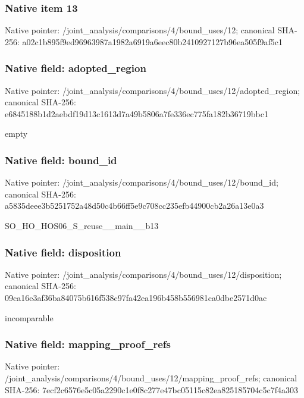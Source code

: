 \documentclass[10pt,a4paper]{article}
\begin{document}
\subsubsection{Native item 13}
Native pointer: /joint\_\allowbreak{}analysis/comparisons/4/bound\_\allowbreak{}uses/12; canonical SHA-256: a02c1b895f9ed96963987a1982a6919a6eec80b2410927127b96ea505f9af5c1

\subsubsection{Native field: adopted\_\allowbreak{}region}
Native pointer: /joint\_\allowbreak{}analysis/comparisons/4/bound\_\allowbreak{}uses/12/adopted\_\allowbreak{}region; canonical SHA-256: e6845188b1d2aebdf19d13c1613d7a49b5806a7fe336ec775fa182b36719bbc1

\begingroup\raggedright\sloppy empty\par\endgroup

\subsubsection{Native field: bound\_\allowbreak{}id}
Native pointer: /joint\_\allowbreak{}analysis/comparisons/4/bound\_\allowbreak{}uses/12/bound\_\allowbreak{}id; canonical SHA-256: a5835deee3b5251752a48d50c4b66ff5e9c708cc235efb44900cb2a26a13e0a3

\begingroup\raggedright\sloppy SO\_\allowbreak{}HO\_\allowbreak{}HOS06\_\allowbreak{}S\_\allowbreak{}reuse\_\allowbreak{}\_\allowbreak{}main\_\allowbreak{}\_\allowbreak{}b13\par\endgroup

\subsubsection{Native field: disposition}
Native pointer: /joint\_\allowbreak{}analysis/comparisons/4/bound\_\allowbreak{}uses/12/disposition; canonical SHA-256: 09ca16e3af36ba84075b616f538c97fa42ea196b458b556981ca0dbe2571d0ac

\begingroup\raggedright\sloppy incomparable\par\endgroup

\subsubsection{Native field: mapping\_\allowbreak{}proof\_\allowbreak{}refs}
Native pointer: /joint\_\allowbreak{}analysis/comparisons/4/bound\_\allowbreak{}uses/12/mapping\_\allowbreak{}proof\_\allowbreak{}refs; canonical SHA-256: 7ecf2c6576e5c05a2290c1e0f8c277e47bc05115c82ea825185704c5c7f4a303
\end{document}
